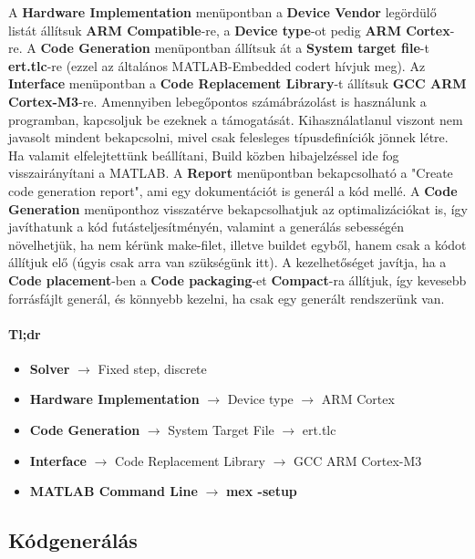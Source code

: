 A \textbf{Hardware Implementation} menüpontban a \textbf{Device Vendor} legördülő listát állítsuk \textbf{ARM Compatible}-re, a \textbf{Device type}-ot pedig \textbf{ARM Cortex}-re.
A \textbf{Code Generation} menüpontban állítsuk át a \textbf{System target file}-t \textbf{ert.tlc}-re (ezzel az általános MATLAB-Embedded codert hívjuk meg).
Az \textbf{Interface} menüpontban a \textbf{Code Replacement Library}-t állítsuk \textbf{GCC ARM Cortex-M3}-re.
Amennyiben lebegőpontos számábrázolást is használunk a programban, kapcsoljuk be ezeknek a támogatását. Kihasználatlanul viszont nem javasolt mindent bekapcsolni, mivel csak felesleges típusdefiníciók jönnek létre. Ha valamit elfelejtettünk beállítani, Build közben hibajelzéssel ide fog visszairányítani a MATLAB.
A \textbf{Report} menüpontban bekapcsolható a "Create code generation report", ami egy dokumentációt is generál a kód mellé.
A \textbf{Code Generation} menüponthoz visszatérve bekapcsolhatjuk az optimalizációkat is, így javíthatunk a kód futásteljesítményén, valamint a generálás sebességén növelhetjük, ha nem kérünk make-filet, illetve buildet egyből, hanem csak a kódot állítjuk elő (úgyis csak arra van szükségünk itt).
A kezelhetőséget javítja, ha a \textbf{Code placement}-ben a \textbf{Code packaging}-et \textbf{Compact}-ra állítjuk, így kevesebb forrásfájlt generál, és könnyebb kezelni, ha csak egy generált rendszerünk van.

\paragraph{Tl;dr}

\begin{itemize}

    \item \textbf{Solver} $\rightarrow$ Fixed step, discrete
    \item \textbf{Hardware Implementation} $\rightarrow$ Device type $\rightarrow$ ARM Cortex
    \item \textbf{Code Generation} $\rightarrow$ System Target File $\rightarrow$ ert.tlc
    \item \textbf{Interface} $\rightarrow$ Code Replacement Library $\rightarrow$ GCC ARM Cortex-M3
    \item \textbf{MATLAB Command Line} $\rightarrow$ \textbf{mex -setup}

\end{itemize}

\subsection{Kódgenerálás}

